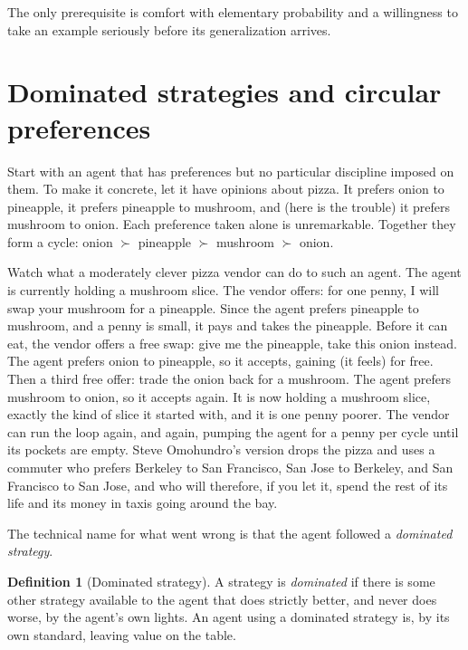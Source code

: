 \documentclass[10pt]{article}
\theoremstyle{definition}
\newtheorem{definition}[theorem]{Definition}
\theoremstyle{remark}
\begin{document}
The only prerequisite is comfort with elementary probability and a willingness to take an example seriously before its generalization arrives.

\section{Dominated strategies and circular preferences}
\label{sec:moneypump}

Start with an agent that has preferences but no particular discipline imposed on them. To make it concrete, let it have opinions about pizza. It prefers onion to pineapple, it prefers pineapple to mushroom, and (here is the trouble) it prefers mushroom to onion. Each preference taken alone is unremarkable. Together they form a cycle: onion $\succ$ pineapple $\succ$ mushroom $\succ$ onion.

Watch what a moderately clever pizza vendor can do to such an agent. The agent is currently holding a mushroom slice. The vendor offers: for one penny, I will swap your mushroom for a pineapple. Since the agent prefers pineapple to mushroom, and a penny is small, it pays and takes the pineapple. Before it can eat, the vendor offers a free swap: give me the pineapple, take this onion instead. The agent prefers onion to pineapple, so it accepts, gaining (it feels) for free. Then a third free offer: trade the onion back for a mushroom. The agent prefers mushroom to onion, so it accepts again. It is now holding a mushroom slice, exactly the kind of slice it started with, and it is one penny poorer. The vendor can run the loop again, and again, pumping the agent for a penny per cycle until its pockets are empty. Steve Omohundro's version drops the pizza and uses a commuter who prefers Berkeley to San Francisco, San Jose to Berkeley, and San Francisco to San Jose, and who will therefore, if you let it, spend the rest of its life and its money in taxis going around the bay.

The technical name for what went wrong is that the agent followed a \emph{dominated strategy}.

\begin{definition}[Dominated strategy]
\label{def:dominated}
A strategy is \emph{dominated} if there is some other strategy available to the agent that does strictly better, and never does worse, by the agent's own lights. An agent using a dominated strategy is, by its own standard, leaving value on the table.
\end{definition}
\end{document}
